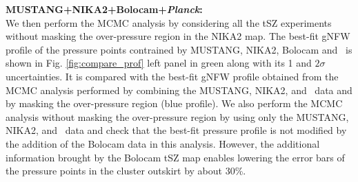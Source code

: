 \documentclass[traditabstract]{aa}
\begin{document}
\noindent\textbf{MUSTANG+NIKA2+Bolocam+\textit{Planck}:}\\
\noindent We then perform the MCMC analysis by considering all the tSZ experiments without masking the over-pressure region in the NIKA2 map. The best-fit gNFW profile of the pressure points contrained by MUSTANG, NIKA2, Bolocam and \planck\ is shown in Fig. \ref{fig:compare_prof} left panel in green along with its 1 and $2\sigma$ uncertainties. It is compared with the best-fit gNFW profile obtained from the MCMC analysis performed by combining the MUSTANG, NIKA2, and \planck\ data and by masking the over-pressure region (blue profile). We also perform the MCMC analysis without masking the over-pressure region by using only the MUSTANG, NIKA2, and \planck\ data and check that the best-fit pressure profile is not modified by the addition of the Bolocam data in this analysis. However, the additional information brought by the Bolocam tSZ map enables lowering the error bars of the pressure points in the cluster outskirt by about 30\%.
\end{document}
